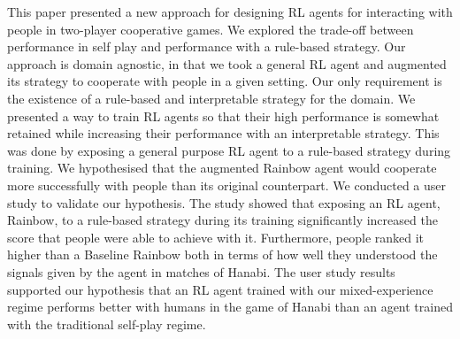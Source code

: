 \documentclass[letterpaper]{article} %
\begin{document}
This paper presented a new approach for designing RL agents for interacting with people in two-player cooperative games.
We explored the trade-off between performance in self play and performance with a rule-based strategy. Our approach is domain agnostic, in that we took a general RL agent and augmented its strategy to cooperate with people in a given setting. Our only requirement is the existence of a rule-based and interpretable strategy for the domain. %
We presented a way to train RL agents so that their high performance is somewhat retained while increasing their performance with an interpretable strategy. This was done by exposing a general purpose  RL agent to a rule-based strategy during training. We hypothesised that the augmented Rainbow agent would cooperate more successfully with people than its original counterpart.
We conducted a user study to validate our hypothesis. The study showed that exposing an RL agent, Rainbow, to a rule-based strategy during its training significantly increased the score that people were able to achieve with it. Furthermore, people ranked it higher than a Baseline Rainbow both in terms of how well they understood the signals given by the agent in matches of Hanabi.
The user study results supported our hypothesis that an RL agent trained with our mixed-experience regime performs better with humans in the game of Hanabi than an agent trained with the traditional self-play regime.


\end{document}
